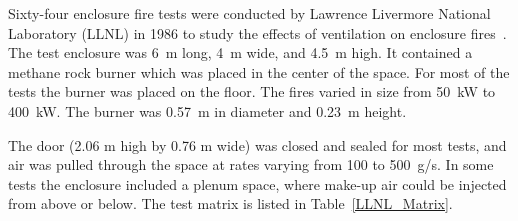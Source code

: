 Sixty-four enclosure fire tests were conducted by Lawrence Livermore National Laboratory (LLNL) in 1986 to study the effects of ventilation on enclosure fires~\cite{Foote:LLNL1986}. The test
enclosure was 6~m long, 4~m wide, and 4.5~m high. It contained a methane rock burner which was placed in the center of the space. For most of the tests the burner was placed on the
floor. The fires varied in size from 50~kW to 400~kW. The burner was 0.57~m in diameter and 0.23~m height.

The door (2.06 m high by 0.76 m wide) was closed and sealed for most tests, and air was pulled through the space at rates varying from 100 to 500~g/s. In some tests the enclosure included a plenum space, where
make-up air could be injected from above or below. The test matrix is listed in Table~\ref{LLNL_Matrix}.

